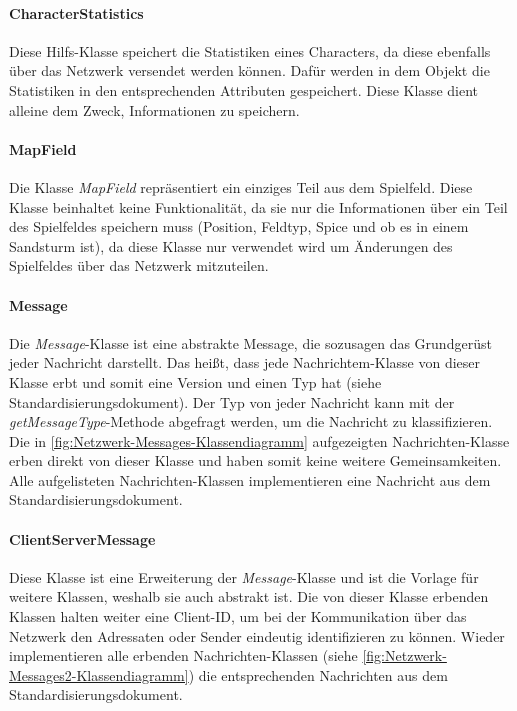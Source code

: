 \documentclass[12pt]{article}
\newcommand{\class}[1]{\textit{#1}-Klasse}
\newcommand{\method}[1]{\textit{#1}-Methode}
\newcounter{fa}
\newcounter{nfa}
\begin{document}
\paragraph{CharacterStatistics}
Diese Hilfs-Klasse speichert die Statistiken eines Characters, da diese ebenfalls über das Netzwerk versendet werden können. Dafür werden in dem Objekt die Statistiken in den entsprechenden Attributen gespeichert. Diese Klasse dient alleine dem Zweck, Informationen zu speichern. 

\paragraph{MapField}
Die Klasse \textit{MapField} repräsentiert ein einziges Teil aus dem Spielfeld. Diese Klasse beinhaltet keine Funktionalität, da sie nur die Informationen über ein Teil des Spielfeldes speichern muss (Position, Feldtyp, Spice und ob es in einem Sandsturm ist), da diese Klasse nur verwendet wird um Änderungen des Spielfeldes über das Netzwerk mitzuteilen. 

\paragraph{Message}
Die \class{Message} ist eine abstrakte Message, die sozusagen das Grundgerüst jeder Nachricht darstellt. Das heißt, dass jede Nachrichtem-Klasse von dieser Klasse erbt und somit eine Version und einen Typ hat (siehe Standardisierungsdokument). Der Typ von jeder Nachricht kann mit der \method{getMessageType} abgefragt werden, um die Nachricht zu klassifizieren. Die in \autoref{fig:Netzwerk-Messages-Klassendiagramm} aufgezeigten Nachrichten-Klasse erben direkt von dieser Klasse und haben somit keine weitere Gemeinsamkeiten. Alle aufgelisteten Nachrichten-Klassen implementieren eine Nachricht aus dem Standardisierungsdokument. 

\paragraph{ClientServerMessage}
Diese Klasse ist eine Erweiterung der \class{Message} und ist die Vorlage für weitere Klassen, weshalb sie auch abstrakt ist. Die von dieser Klasse erbenden Klassen halten weiter eine Client-ID, um bei der Kommunikation über das Netzwerk den Adressaten oder Sender eindeutig identifizieren zu können. Wieder implementieren alle erbenden Nachrichten-Klassen (siehe \autoref{fig:Netzwerk-Messages2-Klassendiagramm}) die entsprechenden Nachrichten aus dem Standardisierungsdokument. 
\end{document}

